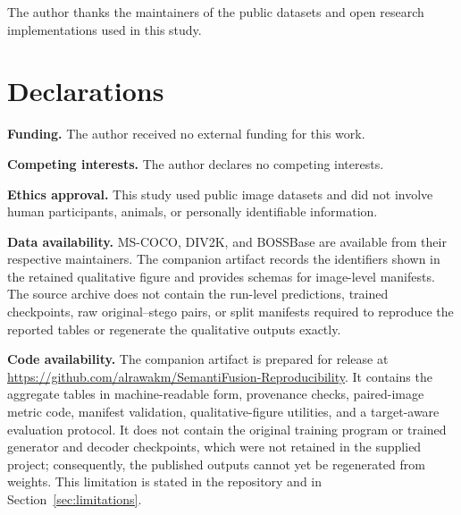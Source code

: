 \documentclass[pdflatex,sn-mathphys-num]{sn-jnl}
\begin{document}
\backmatter

The author thanks the maintainers of the public datasets and open research implementations used in this study.

\section*{Declarations}

\noindent\textbf{Funding.}
The author received no external funding for this work.\par

\noindent\textbf{Competing interests.}
The author declares no competing interests.\par

\noindent\textbf{Ethics approval.}
This study used public image datasets and did not involve human participants, animals, or personally identifiable information.\par

\noindent\textbf{Data availability.}
MS-COCO, DIV2K, and BOSSBase are available from their respective maintainers. The companion artifact records the identifiers shown in the retained qualitative figure and provides schemas for image-level manifests. The source archive does not contain the run-level predictions, trained checkpoints, raw original--stego pairs, or split manifests required to reproduce the reported tables or regenerate the qualitative outputs exactly.\par

\noindent\textbf{Code availability.}
The companion artifact is prepared for release at \url{https://github.com/alrawakm/SemantiFusion-Reproducibility}. It contains the aggregate tables in machine-readable form, provenance checks, paired-image metric code, manifest validation, qualitative-figure utilities, and a target-aware evaluation protocol. It does not contain the original training program or trained generator and decoder checkpoints, which were not retained in the supplied project; consequently, the published outputs cannot yet be regenerated from weights. This limitation is stated in the repository and in Section~\ref{sec:limitations}.


\end{document}

